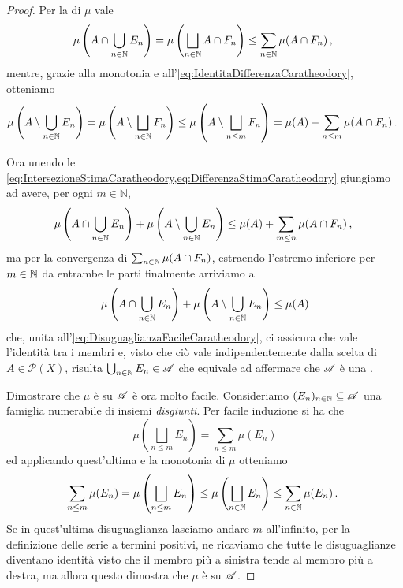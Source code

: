\begin{proof}
	Per la \sigsubadd[ità] di $\mu$ vale
	\begin{equation}\label{eq:IntersezioneStimaCaratheodory}
		\mu\left(A\cap\bigcup_{n\in\mathbb N} E_n\right)=\mu\left(\bigsqcup_{n\in\mathbb N} A\cap F_n\right)\le
		\sum_{n\in\mathbb N} \mu(A\cap F_n)\, \text{, }
	\end{equation}
	mentre, grazie alla monotonia e all'\cref{eq:IdentitaDifferenzaCaratheodory}, otteniamo
	\begin{equation}\label{eq:DifferenzaStimaCaratheodory}
		\mu\left(A\setminus\bigcup_{n\in\mathbb N} E_n\right) = \mu\left(A\setminus\bigsqcup_{n\in\mathbb N} F_n\right) \le \mu\left(A\setminus\bigsqcup_{n\le m} F_n\right) = 
		\mu(A)-\sum_{n\le m}\mu(A\cap F_n)\, \text{. }
	\end{equation}
	
	Ora unendo le \cref{eq:IntersezioneStimaCaratheodory,eq:DifferenzaStimaCaratheodory} giungiamo ad avere, per ogni $m\in\mathbb{N}$, 
	\begin{equation*}
		\mu\left(A\cap\bigcup_{n\in\mathbb N} E_n\right)+\mu\left(A\setminus\bigcup_{n\in\mathbb N} E_n\right)\le
		\mu(A)+\sum_{m\le n}\mu(A\cap F_n) \, \text{, }
	\end{equation*}
	ma per la convergenza di $\sum_{n\in \mathbb N}\mu(A\cap F_n)$, estraendo l'estremo inferiore per $m\in\mathbb N$ da entrambe le parti finalmente arriviamo a
	\begin{equation*}
		\mu\left(A\cap\bigcup_{n\in\mathbb N} E_n\right)+\mu\left(A\setminus\bigcup_{n\in\mathbb N} E_n\right)\le
		\mu(A)
	\end{equation*}
	che, unita all'\cref{eq:DisuguaglianzaFacileCaratheodory}, ci assicura che vale l'identità tra i membri e, visto che ciò vale indipendentemente dalla scelta di $A\in\mathcal P(X)$, risulta $\bigcup_{n\in\mathbb N}E_n\in\mathscr A$ che equivale ad affermare che $\mathscr A$ è una \sigalg{}.
	
	Dimostrare che $\mu$ è \sigadd{} su $\mathscr A$ è ora molto facile.
	Consideriamo $(E_n)_{n\in\mathbb N}\subseteq \mathscr A$ una famiglia numerabile di insiemi \emph{disgiunti}. Per facile induzione si ha che
	\begin{equation*}
		\mu\left(\bigsqcup_{n\le m}E_n\right)=\sum_{n\le m} \mu(E_n)
	\end{equation*}
	ed applicando quest'ultima e la monotonia di $\mu$ otteniamo 
	\begin{equation*}
		\sum_{n\le m} \mu(E_n)=\mu\left(\bigsqcup_{n\le m}E_n\right)\le
		\mu\left(\bigsqcup_{n\in\mathbb N}E_n\right)\le \sum_{n\in\mathbb N} \mu(E_n) \, \text{. }
	\end{equation*}
	Se in quest'ultima disuguaglianza lasciamo andare $m$ all'infinito, per la definizione delle serie a termini positivi, ne ricaviamo che tutte le disuguaglianze diventano identità visto che il membro più a sinistra tende al membro più a destra, ma allora questo dimostra che $\mu$ è \sigadd{} su $\mathscr A$.
	

\end{proof}
